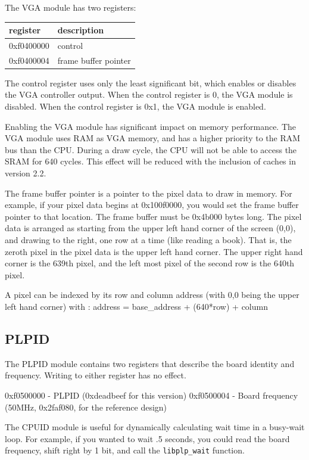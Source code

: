 \documentclass{article}
\begin{document}
The VGA module has two registers: 

\begin{tabular}{ | l | l |}
\hline
register & description \\
\hline
0xf0400000 & control \\
0xf0400004 & frame buffer pointer \\
\hline
\end{tabular}

The control register uses only the least significant bit, which enables or disables the VGA controller output. When the control register is 0, the VGA module is disabled. When the control register is 0x1, the VGA module is enabled.

Enabling the VGA module has significant impact on memory performance. The VGA module uses RAM as VGA memory, and has a higher priority to the RAM bus than the CPU. During a draw cycle, the CPU will not be able to access the SRAM for 640 cycles. This effect will be reduced with the inclusion of caches in version 2.2.

The frame buffer pointer is a pointer to the pixel data to draw in memory. For example, if your pixel data begins at 0x100f0000, you would set the frame buffer pointer to that location. The frame buffer must be 0x4b000 bytes long. The pixel data is arranged as starting from the upper left hand corner of the screen (0,0), and drawing to the right, one row at a time (like reading a book). That is, the zeroth pixel in the pixel data is the upper left hand corner. The upper right hand corner is the 639th pixel, and the left most pixel of the second row is the 640th pixel.

A pixel can be indexed by its row and column address (with 0,0 being the upper left hand corner) with : address = base\_address + (640*row) + column 

\subsection{PLPID}
The PLPID module contains two registers that describe the board identity and frequency. Writing to either register has no effect.

0xf0500000 - PLPID (0xdeadbeef for this version) 0xf0500004 - Board frequency (50MHz, 0x2faf080, for the reference design)

The CPUID module is useful for dynamically calculating wait time in a busy-wait loop. For example, if you wanted to wait .5 seconds, you could read the board frequency, shift right by 1 bit, and call the \verb+libplp_wait+ function. 
\end{document}
